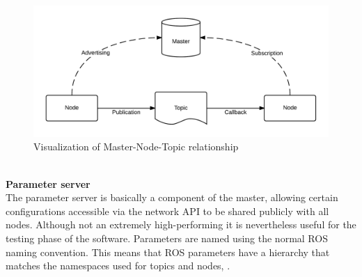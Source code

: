 \begin{figure}[H]
    \centering
    \includegraphics{Images/Chapter 1/ROS-master-node-topic.png}
    \caption{Visualization of Master-Node-Topic relationship}
    \label{fig:master-node-topic}
\end{figure}
\\
\newline
\textbf{Parameter server}\\
The parameter server is basically a component of the master, allowing certain configurations accessible via the network API to be shared publicly with all nodes. Although not an extremely high-performing it is nevertheless useful for the testing phase of the software. Parameters are named using the normal ROS naming convention. This means that ROS parameters have a hierarchy that matches the namespaces used for topics and nodes, \citet{rosparmserv}.
